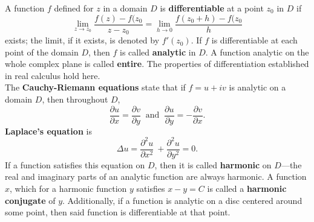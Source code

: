 \documentclass[12pt,letterpaper]{article}
\begin{document}
A function \(f\) defined for \(z\) in a domain \(D\) is \textbf{differentiable} at a point \(z_{0}\) in \(D\) if \[\lim_{z \to z_{0}} \frac{f(z)-f(z_{0}}{z-z_{0}} = \lim_{h \to 0} \frac{f(z_{0}+h) - f(z_{0}}{h}\] exists; the limit, if it exists, is denoted by \(f'(z_{0})\). If \(f\) is differentiable at each point of the domain \(D\), then \(f\) is called \textbf{analytic} in \(D\). A function analytic on the whole complex plane is called \textbf{entire}. The properties of differentiation established in real calculus hold here. \\

The \textbf{Cauchy-Riemann equations} state that if \(f = u + iv\) is analytic on a domain \(D\), then throughout \(D\), \[\frac{\partial u}{\partial x} = \frac{\partial v}{\partial y}\ \text{ and }\ \frac{\partial u}{\partial y} = -\frac{\partial v}{\partial x}.\] \textbf{Laplace's equation} is \[\Delta u = \frac{\partial^{2} u}{\partial x^{2}}\ + \frac{\partial^{2} u}{\partial y^{2}} = 0.\] If a function satisfies this equation on \(D\), then it is called \textbf{harmonic} on \(D\)---the real and imaginary parts of an analytic function are always harmonic. A function \(x\), which for a harmonic function \(y\) satisfies \(x-y = C\) is called a \textbf{harmonic conjugate} of \(y\). Additionally, if a function is analytic on a disc centered around some point, then said function is differentiable at that point.
\end{document}

